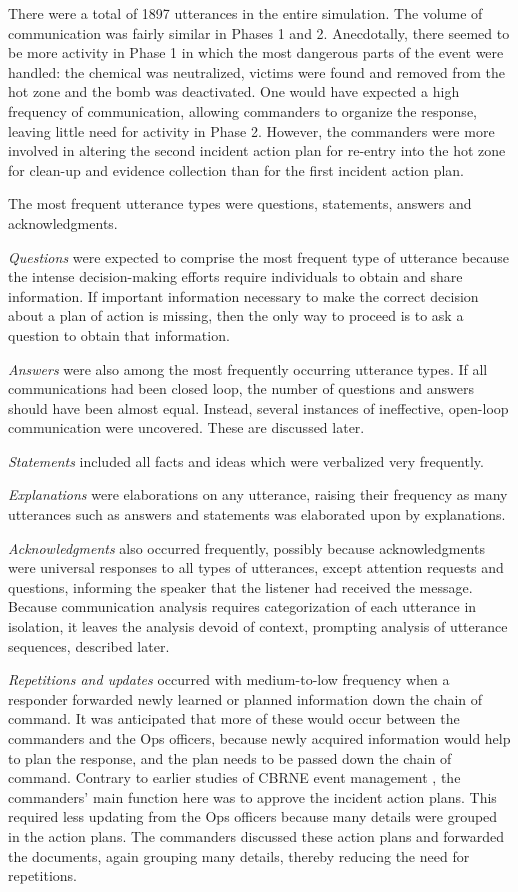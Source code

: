 \documentclass[link]{IWCOMP}
\begin{document}
There were a total of 1897 utterances in the entire simulation. The volume
of communication was fairly similar in Phases 1 and 2. Anecdotally, there
seemed to be more activity in Phase 1 in which the most dangerous parts of
the event were handled: the chemical was neutralized, victims were found and
removed from the hot zone and the bomb was deactivated. One would have
expected a high frequency of communication, allowing commanders to organize
the response, leaving little need for activity in Phase 2. However, the
commanders were more involved in altering the second incident action plan
for re-entry into the hot zone for clean-up and evidence collection than for
the first incident action plan.

The most frequent utterance types were questions, statements, answers and
acknowledgments.

\textit{Questions} were expected to comprise the most frequent type of utterance because the
intense decision-making efforts require individuals to obtain and share
information. If important information necessary to make the correct decision
about a plan of action is missing, then the only way to proceed is to ask a
question to obtain that information.

\textit{Answers} were also among the most frequently occurring utterance types. If all
communications had been closed loop, the number of questions and answers
should have been almost equal. Instead, several instances of ineffective,
open-loop communication were uncovered. These are discussed later.

\textit{Statements} included all facts and ideas which were verbalized very frequently.

\textit{Explanations} were elaborations on any utterance, raising their frequency as many
utterances such as answers and statements was elaborated upon by
explanations.

 \textit{Acknowledgments} also occurred frequently, possibly because acknowledgments were universal
responses to all types of utterances, except attention requests and
questions, informing the speaker that the listener had received the message.
Because communication analysis requires categorization of each utterance in
isolation, it leaves the analysis devoid of context, prompting analysis of
utterance sequences, described later.

\textit{Repetitions and updates} occurred with medium-to-low frequency when a responder forwarded newly
learned or planned information down the chain of command. It was anticipated
that more of these would occur between the commanders and the Ops officers,
because newly acquired information would help to plan the response, and the
plan needs to be passed down the chain of command. Contrary to earlier
studies of CBRNE event management \citep{bib37}, the
commanders' main function here was to approve the incident action plans.
This required less updating from the Ops officers because many details were
grouped in the action plans. The commanders discussed these action plans and
forwarded the documents, again grouping many details, thereby reducing the
need for repetitions.
\end{document}
